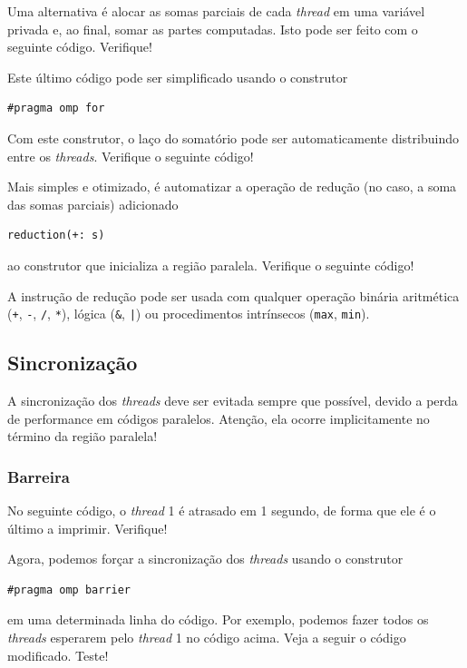 Uma alternativa é alocar as somas parciais de cada {\it thread} em uma variável privada e, ao final, somar as partes computadas. Isto pode ser feito com o seguinte código. Verifique!



Este último código pode ser simplificado usando o construtor
\begin{verbatim}
#pragma omp for
\end{verbatim}
Com este construtor, o laço do somatório pode ser automaticamente distribuindo entre os {\it threads}. Verifique o seguinte código!



Mais simples e otimizado, é automatizar a operação de redução (no caso, a soma das somas parciais) adicionado
\begin{verbatim}
reduction(+: s)
\end{verbatim}
ao construtor que inicializa a região paralela. Verifique o seguinte código!



\begin{obs}
  A instrução de redução pode ser usada com qualquer operação binária aritmética (\verb=+=, \verb=-=, \verb=/=, \verb=*=), lógica (\verb=&=, \verb=|=) ou procedimentos intrínsecos (\verb=max=, \verb=min=).
\end{obs}

\subsection{Sincronização}

A sincronização dos {\it threads} deve ser evitada sempre que possível, devido a perda de performance em códigos paralelos. Atenção, ela ocorre implicitamente no término da região paralela!

\subsubsection{Barreira}

No seguinte código, o {\it thread} 1 é atrasado em 1 segundo, de forma que ele é o último a imprimir. Verifique!



Agora, podemos forçar a sincronização dos {\it threads} usando o construtor
\begin{verbatim}
#pragma omp barrier
\end{verbatim}
em uma determinada linha do código. Por exemplo, podemos fazer todos os {\it threads} esperarem pelo {\it thread} 1 no código acima. Veja a seguir o código modificado. Teste!


